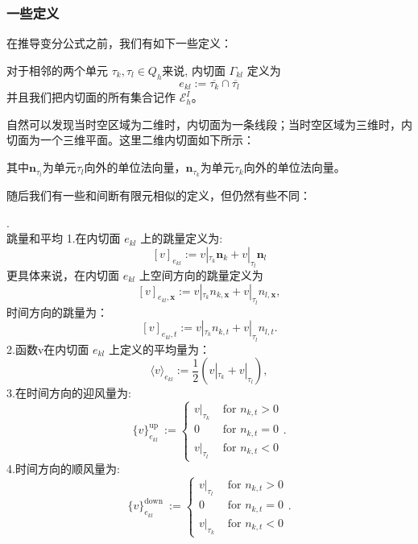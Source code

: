 \subsubsection*{一些定义}
在推导变分公式之前，我们有如下一些定义：
\begin{definition}
    对于相邻的两个单元 $\tau_k,\tau_l\in Q_h$来说, 内切面 $\Gamma_{kl}$ 定义为
    $$e_{kl}:=\overline{\tau_k}\cap\overline{\tau_l}$$
    并且我们把内切面的所有集合记作 $\mathscr{E}_h^I$。
\end{definition}
自然可以发现当时空区域为二维时，内切面为一条线段；当时空区域为三维时，内切面为一个三维平面。这里二维内切面如下所示：

\begin{center}
\end{center}
其中$\textbf{n}_{\tau_l}$为单元$\tau_l$向外的单位法向量，$\textbf{n}_{\tau_k}$为单元$\tau_k$向外的单位法向量。

随后我们有一些和间断有限元相似的定义，但仍然有些不同：

\begin{definition}\label{def}.\\
    跳量和平均
    1.在内切面 $e_{kl}$ 上的跳量定义为:
    $$[v]_{e_{k l}}:=v|_{\tau_{k}} \boldsymbol{n}_{k}+v|_{\tau_{l}} \boldsymbol{n}_{l} $$
    更具体来说，在内切面 $e_{kl}$ 上空间方向的跳量定义为
    $$[v]_{e_{k l}, \boldsymbol{x}}:=v|_{\tau_{k}} n_{k, \boldsymbol{x}}+v|_{\tau_{l}} n_{l, \boldsymbol{x}} ,$$
    时间方向的跳量为：
    $$[v]_{e_{k l}, t}:=v|_{\tau_{k}} n_{k, t}+v|_{\tau_{l}} n_{l, t}  .$$
    2.函数v在内切面  $e_{kl}$ 上定义的平均量为：
    $$\langle v\rangle_{e_{kl}}:=\frac{1}{2}\left(v|_{\tau_{k}}+v|_{\tau_{l}}\right) ,$$
    3.在时间方向的迎风量为:
    $$\{v\}_{e_{k l}}^{\text {up }}:=\left\{\begin{array}{ll}
        v|_{ \tau_{k}} & \text { for } n_{k, t}>0 \\
        0 & \text { for } n_{k, t}=0 \\
        v|_{ \tau_{l}} & \text { for } n_{k, t}<0
        \end{array}  .\right.$$
    4.时间方向的顺风量为:
    $$\{v\}_{e_{k l}}^{\text {down }}:=\left\{\begin{array}{ll}
        v|_{ \tau_{l}} & \text { for } n_{k, t}>0 \\
        0 & \text { for } n_{k, t}=0 \\
        v|_{ \tau_{k}} & \text { for } n_{k, t}<0
        \end{array}  .\right.$$
\end{definition}

